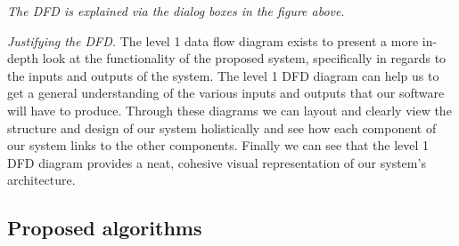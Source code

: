 \textit{The DFD is explained via the dialog boxes in 
the figure above}.\\ \vspace{0.2cm}

\textit{Justifying the DFD.} The level 1 data flow diagram 
exists to present a more in-depth look at the functionality of
the proposed system, specifically in regards to the inputs and 
outputs of the system. The level 1 DFD diagram can help 
us to get a general understanding of the various inputs and 
outputs that our software will have to produce. Through these
diagrams we can layout and clearly view the structure and
design of our system holistically and see how each component
of our system links to the other components. Finally we can 
see that the level 1 DFD diagram provides a neat, cohesive 
visual representation of our system's architecture.

\subsection{\textsf Proposed algorithms}

